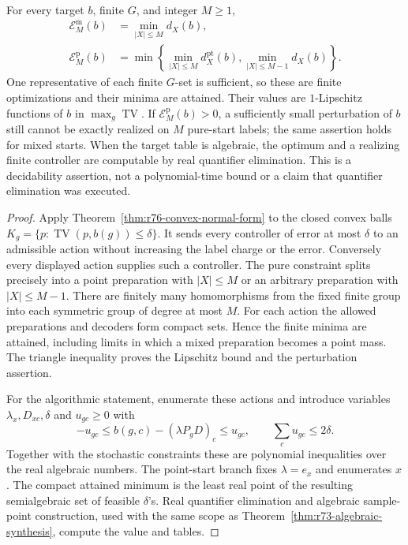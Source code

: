\begin{theorem}
\label{thm:r76-minimax-normal-form}
For every target $b$, finite $G$, and integer $M\ge1$,
\begin{align}
 \mathcal E_M^{\mathrm m}(b)&=\min_{|X|\le M}d_X(b),\label{eq:r76-mixed-error}\\
 \mathcal E_M^{\mathrm p}(b)&=
 \min\left\{\min_{|X|\le M}d_X^{\mathrm{pt}}(b),
             \min_{|X|\le M-1}d_X(b)\right\}.
 \label{eq:r76-pure-error}
\end{align}
One representative of each finite $G$-set is sufficient, so these are
finite optimizations and their minima are attained. Their values are
$1$-Lipschitz functions of $b$ in $\max_g\operatorname{TV}$.
If $\mathcal E_M^{\mathrm p}(b)>0$, a sufficiently small perturbation of
$b$ still cannot be exactly realized on $M$ pure-start labels; the same
assertion holds for mixed starts. When the target table is algebraic,
the optimum and a realizing finite controller are computable by real
quantifier elimination. This is a decidability assertion, not a
polynomial-time bound or a claim that quantifier elimination was executed.
\end{theorem}
\begin{proof}
Apply Theorem~\ref{thm:r76-convex-normal-form} to the closed convex
balls $K_g=\{p:\operatorname{TV}(p,b(g))\le\delta\}$.
It sends every controller of error at most $\delta$ to an admissible
action without increasing the label charge or the error. Conversely
every displayed action supplies such a controller. The pure constraint
splits precisely into a point preparation with $|X|\le M$ or an
arbitrary preparation with $|X|\le M-1$.
There are finitely many homomorphisms from the fixed finite group into
each symmetric group of degree at most $M$. For each action the allowed
preparations and decoders form compact sets. Hence the finite minima
are attained, including limits in which a mixed preparation becomes a
point mass. The triangle inequality proves the Lipschitz bound and
the perturbation assertion.

For the algorithmic statement, enumerate these actions and introduce
variables $\lambda_x,D_{xc},\delta$ and $u_{gc}\ge0$ with
\[
 -u_{gc}\le b(g,c)-(\lambda P_gD)_c\le u_{gc},\qquad
 \sum_cu_{gc}\le2\delta.
\]
Together with the stochastic constraints these are polynomial
inequalities over the real algebraic numbers. The point-start branch
fixes $\lambda=e_x$ and enumerates $x$. The compact attained minimum
is the least real point of the resulting semialgebraic set of feasible
$\delta$'s. Real quantifier elimination and algebraic sample-point
construction, used with the same scope as
Theorem~\ref{thm:r73-algebraic-synthesis}, compute the value and tables.
\end{proof}

